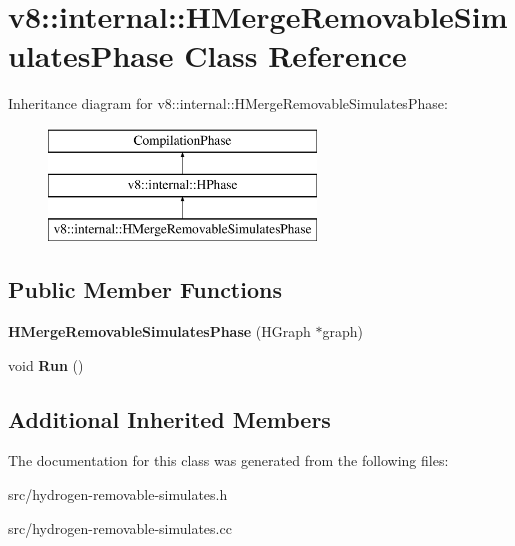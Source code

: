 \hypertarget{classv8_1_1internal_1_1_h_merge_removable_simulates_phase}{}\section{v8\+:\+:internal\+:\+:H\+Merge\+Removable\+Simulates\+Phase Class Reference}
\label{classv8_1_1internal_1_1_h_merge_removable_simulates_phase}
Inheritance diagram for v8\+:\+:internal\+:\+:H\+Merge\+Removable\+Simulates\+Phase\+:\begin{figure}[H]
\begin{center}
\leavevmode
\includegraphics[height=3.000000cm]{classv8_1_1internal_1_1_h_merge_removable_simulates_phase}
\end{center}
\end{figure}
\subsection*{Public Member Functions}
\begin{DoxyCompactItemize}
\item 
\hypertarget{classv8_1_1internal_1_1_h_merge_removable_simulates_phase_a0baf5548ff5d8ef6ad932c76bb611e62}{}{\bfseries H\+Merge\+Removable\+Simulates\+Phase} (H\+Graph $\ast$graph)\label{classv8_1_1internal_1_1_h_merge_removable_simulates_phase_a0baf5548ff5d8ef6ad932c76bb611e62}

\item 
\hypertarget{classv8_1_1internal_1_1_h_merge_removable_simulates_phase_a520b55839ccbf0def14f4799e4b7082b}{}void {\bfseries Run} ()\label{classv8_1_1internal_1_1_h_merge_removable_simulates_phase_a520b55839ccbf0def14f4799e4b7082b}

\end{DoxyCompactItemize}
\subsection*{Additional Inherited Members}


The documentation for this class was generated from the following files\+:\begin{DoxyCompactItemize}
\item 
src/hydrogen-\/removable-\/simulates.\+h\item 
src/hydrogen-\/removable-\/simulates.\+cc\end{DoxyCompactItemize}
